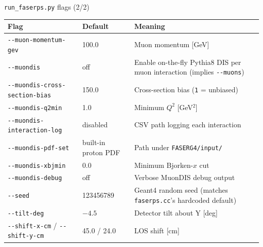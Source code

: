 \documentclass[aspectratio=169]{beamer}
\begin{document}
\begin{frame}{\texttt{run\_faserps.py} flags (2/2)}
  \centering
  \tiny
  \begin{tabular}{@{}p{3.1cm}p{2.1cm}p{5.8cm}@{}}
    \toprule
    \textbf{Flag} & \textbf{Default} & \textbf{Meaning} \\
    \midrule
    \texttt{-{}-muon-momentum-gev} & 100.0 & Muon momentum [GeV] \\
    \texttt{-{}-muondis} & off & Enable on-the-fly Pythia8 DIS per muon
      interaction (implies \texttt{-{}-muons}) \\
    \texttt{-{}-muondis-cross-section-bias} & 150.0 & Cross-section bias
      (\texttt{1} = unbiased) \\
    \texttt{-{}-muondis-q2min} & 1.0 & Minimum $Q^2$ [GeV$^2$] \\
    \texttt{-{}-muondis-interaction-log} & disabled & CSV path logging each
      interaction \\
    \texttt{-{}-muondis-pdf-set} & built-in proton PDF & Path under
      \texttt{FASERG4/input/} \\
    \texttt{-{}-muondis-xbjmin} & 0.0 & Minimum Bjorken-$x$ cut \\
    \texttt{-{}-muondis-debug} & off & Verbose MuonDIS debug output \\
    \texttt{-{}-seed} & 123456789 & Geant4 random seed (matches
      \texttt{faserps.cc}'s hardcoded default) \\
    \texttt{-{}-tilt-deg} & $-4.5$ & Detector tilt about Y [deg] \\
    \texttt{-{}-shift-x-cm} / \texttt{-{}-shift-y-cm} & 45.0 / 24.0 & LOS shift
      [cm] \\
    \bottomrule
  \end{tabular}
\end{frame}
\end{document}
